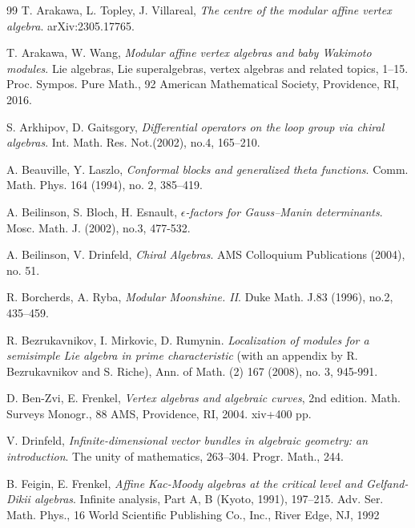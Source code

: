 \documentclass{amsart}
\theoremstyle{definition}
\numberwithin{equation}{section}
\begin{document}
\begin{thebibliography}{99}
 T. Arakawa, L. Topley, J. Villareal, {\it The centre of the modular affine vertex algebra}. arXiv:2305.17765.

 T. Arakawa, W. Wang, {\it Modular affine vertex algebras and baby Wakimoto modules}.
Lie algebras, Lie superalgebras, vertex algebras and related topics, 1–15.
Proc. Sympos. Pure Math., 92
American Mathematical Society, Providence, RI, 2016.

S. Arkhipov, D. Gaitsgory, 
{\it Differential operators on the loop group via chiral algebras}. Int. Math. Res. Not.(2002), no.4, 165–210.

A. Beauville, Y. Laszlo, {\it Conformal blocks and generalized theta functions}. Comm. Math. Phys. 164 (1994), no. 2, 385–419.


 A. Beilinson, S. Bloch, H. Esnault, {\it $\epsilon$-factors for Gauss--Manin determinants}. Mosc. Math. J. (2002), no.3, 477-532.  

 A. Beilinson, V. Drinfeld, {\it Chiral Algebras}. AMS Colloquium Publications (2004), no. 51. 

 R. Borcherds, A. Ryba, {\it Modular Moonshine. II}. Duke Math. J.83 (1996), no.2, 435–459. 

  R. Bezrukavnikov, I. Mirkovic, D. Rumynin. {\it Localization of modules for a semisimple Lie algebra
in prime characteristic} (with an appendix by R. Bezrukavnikov and S. Riche), Ann. of Math. (2)
167 (2008), no. 3, 945-991.

 D. Ben-Zvi, E. Frenkel, {\it Vertex algebras and algebraic curves}, 2nd edition.
Math. Surveys Monogr., 88
AMS, Providence, RI, 2004. xiv+400 pp.

V. Drinfeld, {\em 
Infinite-dimensional vector bundles in algebraic geometry: an introduction}. The unity of mathematics, 263–304.
Progr. Math., 244.

 B. Feigin, E. Frenkel, {\it Affine Kac-Moody algebras at the critical level and Gelfand-Dikii algebras}. 
Infinite analysis, Part A, B (Kyoto, 1991), 197–215.
Adv. Ser. Math. Phys., 16
World Scientific Publishing Co., Inc., River Edge, NJ, 1992


\end{thebibliography}
\end{document}
